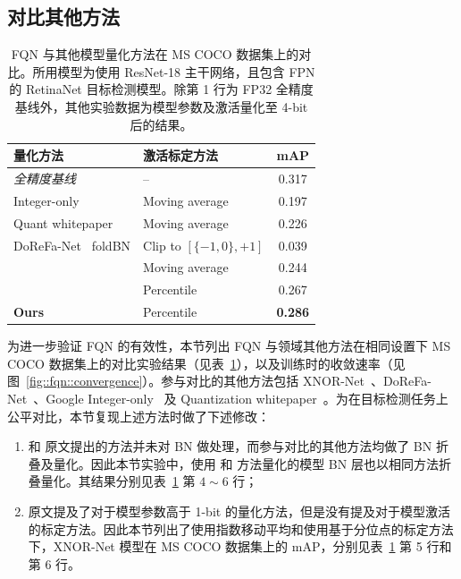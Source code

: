 \documentclass[
  fontset = mac,
]{shtthesis}
\begin{document}
\subsection{对比其他方法} \label{sec::fqn::comparison_exp}

\begin{table}[htb]
  \centering
  \caption{FQN 与其他模型量化方法在 MS COCO 数据集上的对比。所用模型为使用 ResNet-18 主干网络，且包含 FPN 的 RetinaNet 目标检测模型。除第 1 行为 FP32 全精度基线外，其他实验数据为模型参数及激活量化至 4-bit 后的结果。}
  \label{tab::fqn::baselines}
  \begin{tabular}{llc}
    \toprule
    量化方法 & 激活标定方法 & mAP \\
    \midrule
    \emph{全精度基线} & -- &0.317 \\
    \hdashline
    Integer-only~\citep{jacob2018quantization} & Moving average & 0.197 \\
    Quant whitepaper~\citep{krishnamoorthi2018quantizing} & Moving average & 0.226 \\
    DoReFa-Net~\citep{zhou2016dorefanet} foldBN & Clip to $[\{-1,0\}, +1]$ & 0.039 \\
    \hdashline
    \multirow{2}{*}{XNOR-Net~\citep{rastegari2016xnor} foldBN} & Moving average & 0.244 \\
    & Percentile & 0.267 \\
    \hdashline
    \textbf{Ours} & Percentile & \textbf{0.286} \\
    \bottomrule
  \end{tabular}
\end{table}

为进一步验证 FQN 的有效性，本节列出 FQN 与领域其他方法在相同设置下 MS COCO 数据集上的对比实验结果（见表~\ref{tab::fqn::baselines}），以及训练时的收敛速率（见图~\ref{fig::fqn::convergence}）。参与对比的其他方法包括 XNOR-Net~\citep{rastegari2016xnor}、DoReFa-Net~\citep{zhou2016dorefanet}、Google Integer-only~\citep{jacob2018quantization} 及 Quantization whitepaper~\citep{krishnamoorthi2018quantizing}。为在目标检测任务上公平对比，本节复现上述方法时做了下述修改：
\begin{enumerate}[1)]
  \item \citet{zhou2016dorefanet} 和 \citet{rastegari2016xnor} 原文提出的方法并未对 BN 做处理，而参与对比的其他方法均做了 BN 折叠及量化。因此本节实验中，使用 \citet{zhou2016dorefanet} 和 \citet{rastegari2016xnor} 方法量化的模型 BN 层也以相同方法折叠量化。其结果分别见表~\ref{tab::fqn::baselines} 第 $4 \sim 6$ 行；
  \item \citet{rastegari2016xnor} 原文提及了对于模型参数高于 1-bit 的量化方法，但是没有提及对于模型激活的标定方法。因此本节列出了使用指数移动平均和使用基于分位点的标定方法下，XNOR-Net 模型在 MS COCO 数据集上的 mAP，分别见表~\ref{tab::fqn::baselines} 第 5 行和第 6 行。
\end{enumerate}
\end{document}

